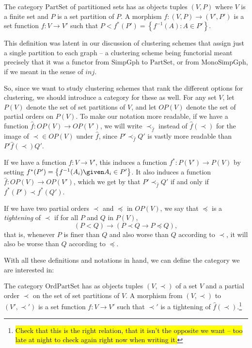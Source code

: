 \documentclass[a4paper,reqno,oneside]{article} %
\begin{document}
\begin{definition}
The category $\mathrm{PartSet}$ of partitioned sets has as objects tuples $(V,P)$ where $V$ is a finite set and $P$ is a set partition of $P$. A morphism $f: (V, P) \to (V', P')$ is a set function $f: V \to V'$ such that $P < f^*(P') = \left\{f^{-1}(A) : A \in P'\right\}$.
\end{definition}

This definition was latent in our discussion of clustering schemes that assign just a single partition to each graph -- a clustering scheme being functorial meant precisely that it was a functor from $\mathrm{SimpGph}$ to $\mathrm{PartSet}$, or from $\mathrm{MonoSimpGph}$, if we meant in the sense of $inj$.

So, since we want to study clustering schemes that rank the different options for clustering, we should introduce a category for these as well. For any set $V$, let $P(V)$ denote the set of set partitions of $V$, and let $OP(V)$ denote the set of partial orders on $P(V)$. To make our notation more readable, if we have a function $\hat{f}: OP(V) \to OP(V')$, we will write $\prec_{\hat{f}}$ instead of $\hat{f}(\prec)$ for the image of $\prec \in OP(V)$ under $\hat{f}$, since $P' \prec_{\hat{f}} Q'$ is vastly more readable than $P' \hat{f}(\prec) Q'$.

If we have a function $f: V \to V'$, this induces a function $f^*: P(V') \to P(V)$ by setting $f^*(P') = \left\{f^{-1}(A_i) \given A_i \in P'\right\}$. It also induces a function $\hat{f}: OP(V) \to OP(V')$, which we get by that $P' \prec_{\hat{f}} Q'$ if and only if $f^*(P') \prec f^*(Q')$.

If we have two partial orders $\prec$ and $\preccurlyeq$ in $OP(V)$, we say that $\preccurlyeq$ is a \emph{tightening} of $\prec$ if for all $P$ and $Q$ in $P(V)$,
$$(P < Q) \rightarrow (P \prec Q \rightarrow P \preccurlyeq Q),$$
that is, whenever $P$ is finer than $Q$ and also worse than $Q$ according to $\prec$, it will also be worse than $Q$ according to $\preccurlyeq$.

With all these definitions and notations in hand, we can define the category we are interested in:

\begin{definition}
The category $\mathrm{OrdPartSet}$ has as objects tuples $(V, \prec)$ of a set $V$ and a partial order $\prec$ on the set of set partitions of $V$. A morphism from $(V,\prec)$ to $(V', \prec')$ is a set function $f: V \to V'$ such that $\prec'$ is a tightening of $\hat{f}(\prec)$.\footnote{\hl{Check that this is the right relation, that it isn't the opposite we want -- too late at night to check again right now when writing it.}}
\end{definition}
\end{document}
